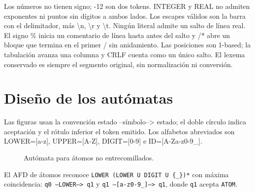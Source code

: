\documentclass[11pt,letterpaper]{article}
\newcommand{\code}[1]{{\ttfamily\small #1}}
\begin{document}
Los números no tienen signo; \code{-12} son dos tokens. \code{INTEGER} y \code{REAL} no admiten exponentes ni puntos sin dígitos a ambos lados. Los escapes válidos son la barra con el delimitador, más \code{\textbackslash n}, \code{\textbackslash r} y \code{\textbackslash t}. Ningún literal admite un salto de línea real. El signo \code{\%} inicia un comentario de línea hasta antes del salto y \code{/*} abre un bloque que termina en el primer \code{*/} sin anidamiento. Las posiciones son 1-based; la tabulación avanza una columna y \code{CRLF} cuenta como un único salto. El lexema conservado es siempre el segmento original, sin normalización ni conversión.

\section{Diseño de los autómatas}

Las figuras usan la convención estado --símbolo--> estado; el doble círculo indica aceptación y el rótulo inferior el token emitido. Los alfabetos abreviados son \code{LOWER=[a-z]}, \code{UPPER=[A-Z]}, \code{DIGIT=[0-9]} e \code{ID=[A-Za-z0-9\_]}.

\begin{figure}[H]
  \centering
  \caption{Autómata para átomos no entrecomillados.}
\end{figure}

El AFD de átomos reconoce \texttt{LOWER (LOWER U DIGIT U \{\_\})*} con máxima coincidencia: \texttt{q0 --LOWER--> q1} y \texttt{q1 --[a-z0-9\_]--> q1}, donde \texttt{q1} acepta \texttt{ATOM}.
\end{document}
